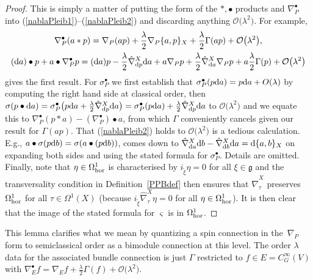 \documentclass[pdftex]{sigma}
\numberwithin{equation}{section}
\newcommand{\<}{{\langle}}
\renewcommand{\>}{{\rangle}}
\newcommand{\extd}{{\rm d}}
\newcommand{\cg}{{\mathfrak{g}}}
\begin{document}
\begin{proof} This is simply a matter of putting the form of the $*,\bullet$ products and $\nabla^\bullet_{P}$ into (\ref{nablaPleib1})--(\ref{nablaPleib2}) and discarding anything $\mathcal{O}\big(\lambda^2\big)$. For example,
\begin{gather*} \nabla^\bullet_{P}(a*p) =\nabla_P(ap)+{\lambda\over 2}\nabla_P\{a,p\}_X+{\lambda\over 2}\Gamma(ap)+ \mathcal{O}\big(\lambda^2\big),\\
 (\extd a)\bullet p+a\bullet\nabla^\bullet_{P}p =(\extd a)p-{\lambda\over 2}\hat\nabla^X_{\extd p}\extd a+a\nabla_P p+{\lambda\over 2}\hat\nabla^X_{\extd a}\nabla_Pp+a{\lambda\over 2}\Gamma(p)+ \mathcal{O}\big(\lambda^2\big)\end{gather*}
 gives the first result. For $\sigma_P^\bullet$ we first establish that $\sigma_P^\bullet(p\extd a)=p\extd a+O(\lambda)$ by computing the right hand side at classical order, then $\sigma(p\bullet\extd a)=\sigma_P^\bullet\big(p\extd a+{\lambda\over 2}\hat\nabla^X_{\extd p}\extd a\big)=\sigma_P^\bullet(p\extd a)+{\lambda\over 2}\hat\nabla^X_{\extd p}\extd a$ to $\mathcal{O}\big(\lambda^2\big)$ and we equate this to $\nabla^\bullet_{P}(p*a)-(\nabla^\bullet_{P})\bullet a$, from which $\Gamma$ conveniently cancels given our result for $\Gamma(ap)$. That (\ref{nablaPleib2}) holds to $\mathcal{O}\big(\lambda^2\big)$ is a tedious calculation. E.g., $a\bullet\sigma(p\extd b)=\sigma(a\bullet(p\extd b))$, comes down to $\hat\nabla^X_{\extd a}\extd b-\hat\nabla^X_{\extd b}\extd a=\extd\{a,b\}_X$ on expanding both sides and using the stated formula for $\sigma_P^\bullet$. Details are omitted. Finally, note that $\eta\in \Omega^1_{\rm hor}$ is characterised by $i_{\tilde\xi}\eta=0$ for all $\xi\in \cg$ and the transversality condition in Definition~\ref{PPBdef} then ensures that $\hat\nabla^X_\tau$ preserves $\Omega^1_{\rm hor}$ for all $\tau\in \Omega^1(X)$ (because $i_{\tilde\xi}\hat\nabla^X_\tau\eta=0$ for all $\eta\in \Omega^1_{\rm hor}$). It is then clear that the image of the stated formula for $\varsigma$ is in $\Omega^1_{\rm hor}$. \end{proof}

This lemma clarifies what we mean by quantizing a spin connection in the~$\nabla_P$ form to semiclassical order as a bimodule connection at this level. The order $\lambda$ data for the associated bundle connection is just $\Gamma$ restricted to $f\in E=C^\infty_G(V)$ with $\nabla_E^\bullet f= \nabla_E f+\frac{\lambda}{2} \Gamma(f)+\mathcal{O}\big(\lambda^2\big)$.
\end{document}
